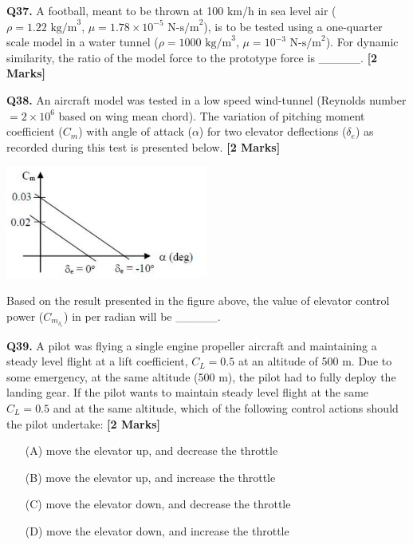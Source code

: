 \documentclass[11pt]{article}
\newcommand{\questionb}[2]{
    \noindent\textbf{Q#2.} #1 \hfill \textbf{[2 Marks]}
}
\begin{document}
\vspace{0.5cm}

\questionb{A football, meant to be thrown at 100 km/h in sea level air ($\rho=1.22 \text{ kg/m}^3$, $\mu=1.78 \times 10^{-5} \text{ N-s/m}^2$), is to be tested using a one-quarter scale model in a water tunnel ($\rho=1000 \text{ kg/m}^3$, $\mu=10^{-3} \text{ N-s/m}^2$). For dynamic similarity, the ratio of the model force to the prototype force is \_\_\_\_\_.}{37}

\vspace{0.5cm}

\questionb{An aircraft model was tested in a low speed wind-tunnel (Reynolds number $= 2 \times 10^6$ based on wing mean chord). The variation of pitching moment coefficient ($C_m$) with angle of attack ($\alpha$) for two elevator deflections ($\delta_e$) as recorded during this test is presented below.}{38}
\begin{center}
\includegraphics[width=0.5\textwidth]{figures/38.png}
\end{center}
Based on the result presented in the figure above, the value of elevator control power ($C_{m_{\delta_e}}$) in per radian will be \_\_\_\_\_.

\vspace{0.5cm}

\questionb{A pilot was flying a single engine propeller aircraft and maintaining a steady level flight at a lift coefficient, $C_L = 0.5$ at an altitude of 500 m. Due to some emergency, at the same altitude (500 m), the pilot had to fully deploy the landing gear. If the pilot wants to maintain steady level flight at the same $C_L = 0.5$ and at the same altitude, which of the following control actions should the pilot undertake:}{39}
\begin{enumerate}
    \item[(A)] move the elevator up, and decrease the throttle
    \item[(B)] move the elevator up, and increase the throttle
    \item[(C)] move the elevator down, and decrease the throttle
    \item[(D)] move the elevator down, and increase the throttle
\end{enumerate}
\end{document}
